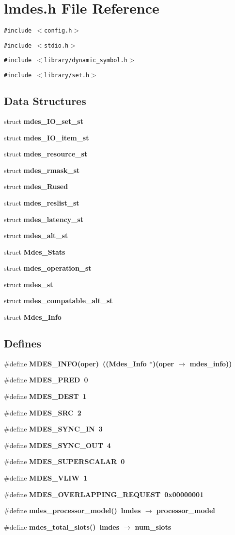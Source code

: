 \section{lmdes.h File Reference}
\label{lmdes_8h}
{\tt \#include $<$config.h$>$}\par
{\tt \#include $<$stdio.h$>$}\par
{\tt \#include $<$library/dynamic\_\-symbol.h$>$}\par
{\tt \#include $<$library/set.h$>$}\par
\subsection*{Data Structures}
\begin{CompactItemize}
\item 
struct \bf{mdes\_\-IO\_\-set\_\-st}
\item 
struct \bf{mdes\_\-IO\_\-item\_\-st}
\item 
struct \bf{mdes\_\-resource\_\-st}
\item 
struct \bf{mdes\_\-rmask\_\-st}
\item 
struct \bf{mdes\_\-Rused}
\item 
struct \bf{mdes\_\-reslist\_\-st}
\item 
struct \bf{mdes\_\-latency\_\-st}
\item 
struct \bf{mdes\_\-alt\_\-st}
\item 
struct \bf{Mdes\_\-Stats}
\item 
struct \bf{mdes\_\-operation\_\-st}
\item 
struct \bf{mdes\_\-st}
\item 
struct \bf{mdes\_\-compatable\_\-alt\_\-st}
\item 
struct \bf{Mdes\_\-Info}
\end{CompactItemize}
\subsection*{Defines}
\begin{CompactItemize}
\item 
\#define \bf{MDES\_\-INFO}(oper)~((\bf{Mdes\_\-Info} $\ast$)(oper $\rightarrow$ mdes\_\-info))
\item 
\#define \bf{MDES\_\-PRED}~0
\item 
\#define \bf{MDES\_\-DEST}~1
\item 
\#define \bf{MDES\_\-SRC}~2
\item 
\#define \bf{MDES\_\-SYNC\_\-IN}~3
\item 
\#define \bf{MDES\_\-SYNC\_\-OUT}~4
\item 
\#define \bf{MDES\_\-SUPERSCALAR}~0
\item 
\#define \bf{MDES\_\-VLIW}~1
\item 
\#define \bf{MDES\_\-OVERLAPPING\_\-REQUEST}~0x00000001
\item 
\#define \bf{mdes\_\-processor\_\-model}()~\bf{lmdes} $\rightarrow$ processor\_\-model
\item 
\#define \bf{mdes\_\-total\_\-slots}()~\bf{lmdes} $\rightarrow$ num\_\-slots
\end{CompactItemize}
